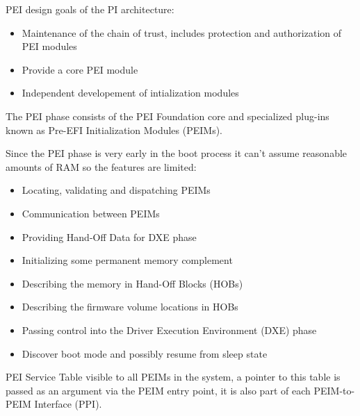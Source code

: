 \begin{enumerate}
    PEI design goals of the PI architecture:
    \begin{itemize}
        \item Maintenance of the chain of trust, includes protection and authorization of PEI modules
        \item Provide a core PEI module
        \item Independent developement of intialization modules
    \end{itemize}
    The PEI phase consists of the PEI Foundation core and specialized plug-ins known as Pre-EFI Initialization Modules (PEIMs).

    Since the PEI phase is very early in the boot process it can't assume reasonable amounts of RAM so the features are limited:
    \begin{itemize}
        \item Locating, validating and dispatching PEIMs
        \item Communication between PEIMs
        \item Providing Hand-Off Data for DXE phase
        \item Initializing some permanent memory complement
        \item Describing the memory in Hand-Off Blocks (HOBs)
        \item Describing the firmware volume locations in HOBs
        \item Passing control into the Driver Execution Environment (DXE) phase
        \item Discover boot mode and possibly resume from sleep state
    \end{itemize}
    PEI Service Table visible to all PEIMs in the system, a pointer to this table is passed as an argument via the PEIM entry point, it is also part of each PEIM-to-PEIM Interface (PPI).



\end{enumerate}
